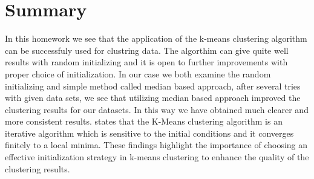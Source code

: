 \section{Summary}
In this homework we see that the application of the k-means clustering algorithm can be successfuly used for clustring data. The algorthim can give quite well results with random initializing and it is open to further improvements with proper choice of initialization. In our case we both examine the random initializing and simple method called median based approach, after several tries with given data sets, we see that utilizing median based approach improved the clustering results for our datasets. In this way we have obtained much clearer and more consistent results. \cite{PENA19991027} states that the K-Means clustering algorithm is an iterative algorithm which is sensitive to the initial conditions and it converges finitely to a local minima. These findings highlight the importance of choosing an effective initialization strategy in k-means clustering to enhance the quality of the clustering results.